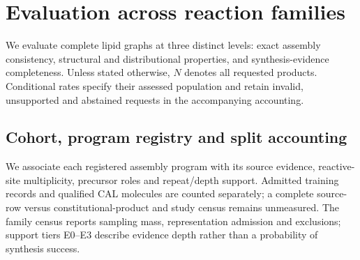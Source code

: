 \section{Evaluation across reaction families}
\label{app:22-results}
We evaluate complete lipid graphs at three distinct levels: exact assembly consistency, structural
and distributional properties, and synthesis-evidence completeness. Unless stated otherwise, $N$
denotes all requested products. Conditional rates specify their assessed population and retain
invalid, unsupported and abstained requests in the accompanying accounting.

\subsection{Cohort, program registry and split accounting}
We associate each registered assembly program with its source evidence, reactive-site multiplicity,
precursor roles and repeat/depth support. Admitted training records and qualified CAL molecules are counted separately; a complete source-row versus constitutional-product and study census remains unmeasured. The family census reports sampling mass, representation admission and exclusions; support tiers E0--E3 describe evidence depth rather than a probability of synthesis
success.
